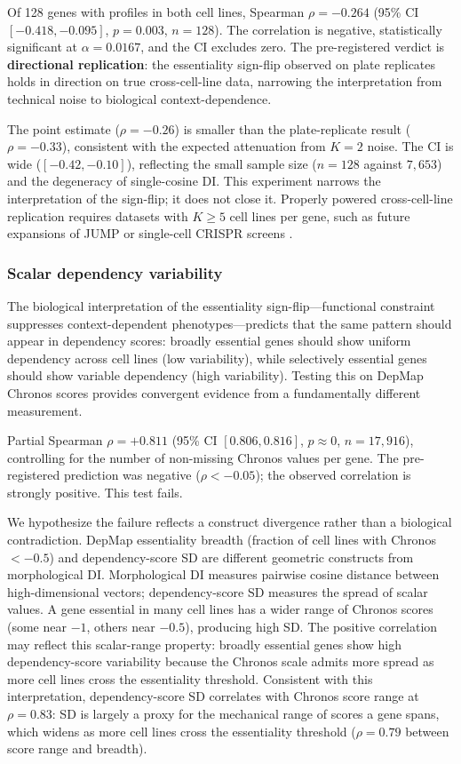 \documentclass[11pt]{article}
\begin{document}
Of 128 genes with profiles in both cell lines, Spearman
$\rho = -0.264$ (95\% CI $[-0.418, -0.095]$, $p = 0.003$,
$n = 128$).  The correlation is negative, statistically significant
at $\alpha = 0.0167$, and the CI excludes zero.  The pre-registered
verdict is \textbf{directional replication}: the essentiality sign-flip
observed on plate replicates holds in direction on true
cross-cell-line data, narrowing the interpretation from technical noise
to biological context-dependence.

The point estimate ($\rho = -0.26$) is smaller than the plate-replicate result
($\rho = -0.33$), consistent with the expected attenuation from $K = 2$
noise.  The CI is wide ($[-0.42, -0.10]$), reflecting the small
sample size ($n = 128$ against $7{,}653$) and the
degeneracy of single-cosine DI.  This experiment narrows the
interpretation of the sign-flip; it does not close it.  Properly powered
cross-cell-line replication requires datasets with $K \geq 5$ cell
lines per gene, such as future expansions of JUMP or single-cell CRISPR
screens \citep{tahoe2025}.

\subsubsection{Scalar dependency variability}

The biological interpretation of the essentiality sign-flip---functional
constraint suppresses context-dependent phenotypes---predicts that the
same pattern should appear in dependency scores: broadly essential genes
should show uniform dependency across cell lines (low variability),
while selectively essential genes should show variable dependency (high
variability).  Testing this on DepMap Chronos scores provides convergent
evidence from a fundamentally different measurement.

Partial Spearman $\rho = +0.811$ (95\% CI $[0.806, 0.816]$,
$p \approx 0$, $n = 17{,}916$), controlling for the number of
non-missing Chronos values per gene.  The pre-registered prediction
was negative ($\rho < -0.05$); the observed correlation is strongly
positive.  This test fails.

We hypothesize the failure reflects a construct divergence rather than
a biological contradiction.  DepMap essentiality breadth
(fraction of cell lines with Chronos $< -0.5$) and dependency-score SD
are different geometric constructs from morphological DI.  Morphological
DI measures pairwise cosine distance between high-dimensional vectors;
dependency-score SD measures the spread of scalar values.  A gene
essential in many cell lines has a wider range of Chronos
scores (some near $-1$, others near $-0.5$), producing high SD.  The
positive correlation may reflect this scalar-range property: broadly
essential genes show high dependency-score variability because
the Chronos scale admits more spread as more cell lines cross the
essentiality threshold.  Consistent with this interpretation,
dependency-score SD correlates with Chronos score range at
$\rho = 0.83$: SD is largely a proxy for the mechanical range of
scores a gene spans, which widens as more cell lines cross the
essentiality threshold ($\rho = 0.79$ between score range and
breadth).
\end{document}
